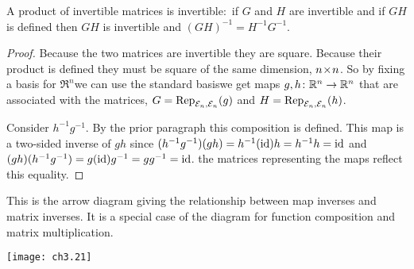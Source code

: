 \begin{lemma} \label{lem:ProdInvIsInv}
A product of invertible matrices is invertible:~if
\( G \) and \( H \) are invertible and if \( GH \) is defined then
\( GH \) is invertible and \( (GH)^{-1}=H^{-1}G^{-1} \).
\end{lemma}

\begin{proof}
Because the two matrices are invertible they are square.
Because their product is defined they must be square of the same dimension,
$\nbyn{n}$.
So by fixing a basis for $\Re^n$\Dash we can use the standard 
basis\Dash we get maps  
$\map{g,h}{\Re^n}{\Re^n}$ that are associated with the matrices,
$G=\rep{g}{\stdbasis_n,\stdbasis_n}$ and
$H=\rep{h}{\stdbasis_n,\stdbasis_n}$.

Consider $h^{-1}g^{-1}$. 
By the prior paragraph this composition is defined.
This map is a two-sided inverse of \( gh \) since
\(
  (h^{-1}g^{-1})(gh)
  =
  h^{-1}(\identity)h
  =h^{-1}h
  =\identity
\)
and
\(
  (gh)(h^{-1}g^{-1})
  =
  g(\identity)g^{-1}
  =gg^{-1}
  =\identity
\).
the matrices representing the maps reflect this equality.
\end{proof}

This is the arrow diagram giving the relationship
between map inverses and matrix inverses. 
It is a special case
of the diagram for function composition and matrix multiplication.
\smallskip
\begin{center}
    \texttt{[image: ch3.21]}
\end{center}

